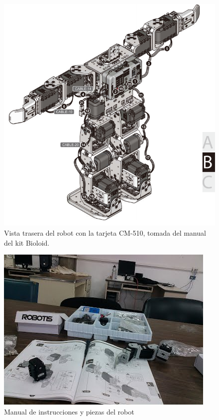 \begin{figure}[hbtp]
\centering
\includegraphics[scale=0.3]{imagenes/RobotTrasero.png}
\caption{Vista trasera del robot con la tarjeta CM-510, tomada del manual del kit Bioloid.}
\label{fig:trasera1}
\end{figure}

\begin{figure}[hbtp]
\centering
\includegraphics[scale=0.5]{imagenes/CIMG0225.jpg}
\caption{Manual de instrucciones y piezas del robot}
\end{figure}

